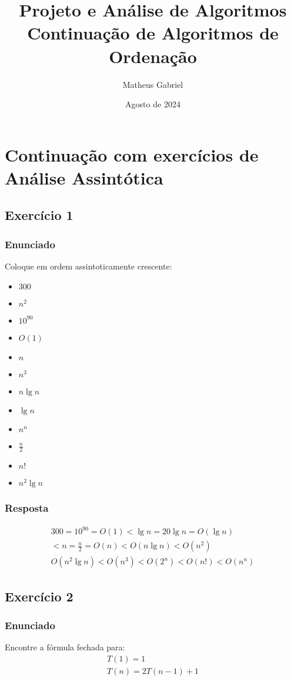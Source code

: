 \documentclass{article}
\title{Projeto e Análise de Algoritmos \\
\large Continuação de Algoritmos de Ordenação}
\author{Matheus Gabriel}
\date{Agosto de 2024}
\begin{document}
\maketitle

\section{Continuação com exercícios de Análise Assintótica}
\subsection{Exercício 1}
\subsubsection{Enunciado}
Coloque em ordem assintoticamente crescente:

\begin{itemize}
    \item $300$
    \item $n^2$
    \item $10^90$
    \item $O(1)$
    \item $n$
    \item $n^3$
    \item $n \lg n$
    \item $\lg n$
    \item $n^n$
    \item $\frac{n}{2}$
    \item $n!$
    \item $n^2 \lg n$
\end{itemize}
\subsubsection{Resposta}
\begin{align*}
    300 = 10^90 = O(1) < \lg n = 20 \lg n = O(\lg n) \\
    < n = \frac{n}{2} = O(n) < O(n \lg n) < O(n^2) \\
    O(n^2 \lg n) < O(n^3) < O(2^n) < O(n!) < O(n^n)
\end{align*}

\subsection{Exercício 2}
\subsubsection{Enunciado}
Encontre a fórmula fechada para:
\begin{align*}
    T(1) = 1 \\
    T(n) = 2T(n-1) + 1
\end{align*}
\end{document}
